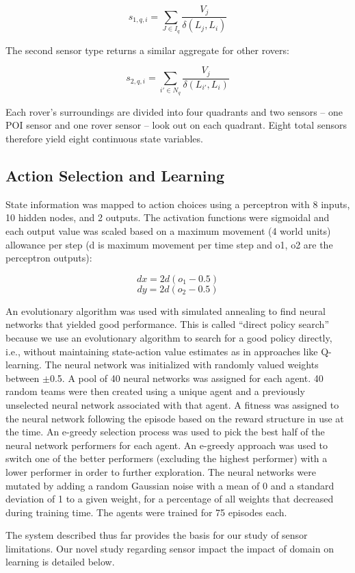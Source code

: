 \documentclass[letterpaper, 10 pt, conference]{ieeeconf}  %
\begin{document}
\[
s_{1,q,i} =  \sum_{J \in I_q}  \frac{V_j}{\delta (L_j, L_i)} 
\]

The second sensor type returns a similar aggregate for other rovers:

\[
s_{2,q,i} =  \sum_{i' \in N_q}  \frac{V_j}{\delta (L_{i'}, L_i)}  
\]

Each rover’s surroundings are divided into four quadrants and two
sensors -- one POI sensor and one rover sensor -- look out on each
quadrant. Eight total sensors therefore yield eight continuous state
variables.

\subsection{Action Selection and Learning}
State information was mapped to action choices using a perceptron with
8 inputs, 10 hidden nodes, and 2 outputs. The activation functions
were sigmoidal and each output value was scaled based on a maximum
movement (4 world units) allowance per step (d is maximum movement per time step and
o1, o2 are the perceptron outputs):

\[
dx = 2d(o_1-0.5)
\]
\[
dy = 2d(o_2-0.5)
\]

An evolutionary algorithm was used with simulated annealing to find
neural networks that yielded good performance. This is called “direct
policy search” because we use an evolutionary algorithm to search for
a good policy directly, i.e., without maintaining state-action value
estimates as in approaches like Q-learning. The neural network was initialized with randomly
valued weights between \(\pm\)0.5.  A pool of 40 neural networks was assigned for each agent.  40 random
teams were then created using a unique agent and a previously unselected neural network associated with that agent.
A fitness was assigned to the neural network following the episode based on the reward structure in use at 
the time.  An e-greedy selection process was used to pick the best half of the neural network performers for each agent.  An 
e-greedy approach was used to switch one of the better performers (excluding the highest performer) with a lower performer in 
order to further exploration.  The neural networks were mutated by adding a random Gaussian noise with a mean of 0 and a standard deviation of 1 to a given weight, for a percentage of all weights that decreased during training time.
The agents were trained for 75 episodes each.

The system described thus far provides the basis for our study of sensor limitations. Our novel
study regarding sensor impact the impact of domain on learning is detailed below.
\end{document}
